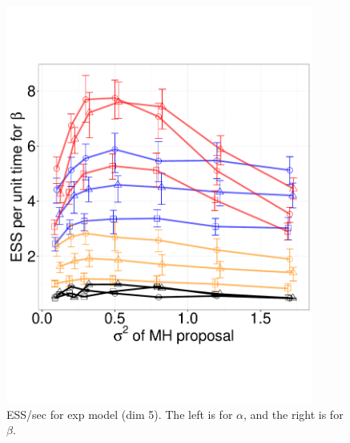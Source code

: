 \begin{figure}[H]
\begin{minipage}[hp]{0.45\linewidth}
    \includegraphics [width=0.90\textwidth, angle=0]{figs/exp_5_beta.pdf}
    \vspace{-0 in}
  \end{minipage}
    \caption{ESS/sec for exp model (dim 5). The left is for $\alpha$, and the right is for $\beta$.}
     \label{fig:ESS_EXP_D5}
  \end{figure}

